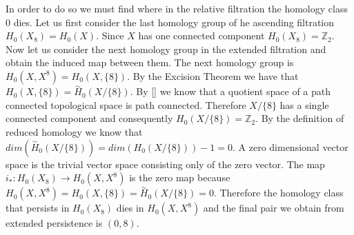 In order to do so we must find where in the relative filtration the homology class $0$ dies. Let us first consider the last homology group of he ascending filtration $H_0(X_8) = H_0(X)$. Since $X$ has one connected component $H_0(X_8) = \mathbb{Z}_2$. Now let us consider the next homology group in the extended filtration and obtain the induced map between them. The next homology group is $H_0(X, X^8) = H_0(X, \{8\})$. By the Excision Theorem we have that $H_0(X, \{8\}) = \overset{\sim}{H}_0(X / \{8\})$. By [] we know that a quotient space of a path connected topological space is path connected. Therefore $X / \{8\}$ has a single connected component and consequently $H_0(X / \{8\}) =\mathbb{Z}_2$.
By the definition of reduced homology we know that $dim(\overset{\sim}{H}_0(X / \{8\})) = dim(H_0(X / \{8\})) - 1 = 0$.
A zero dimensional vector space is the trivial vector space consisting only of the zero vector. The map $i_* : H_0(X_8) \to H_0(X, X^8)$ is the zero map because $H_0(X, X^8) = H_0(X, \{8\}) = \overset{\sim}{H}_0(X / \{8\}) = 0$. Therefore the homology class that persists in $H_0(X_8)$ dies in $H_0(X, X^8)$ and the final pair we obtain from extended persistence is $(0, 8)$.


